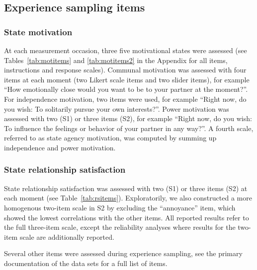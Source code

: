 \documentclass[jou,a4paper,draftfirst]{apa6}\usepackage[]{graphicx}\usepackage[]{color}
\begin{document}
\subsection{Experience sampling items}

\subsubsection{State motivation}
At each measurement occasion, three five motivational states were assessed (see Tables~\ref{tab:motitems} and \ref{tab:motitems2} in the Appendix for all items, instructions and response scales). Communal motivation was assessed with four items at each moment (two Likert scale items and two slider items), for example ``How emotionally close would you want to be to your partner at the moment?''. For independence motivation, two items were used, for example ``Right now, do you wish: To solitarily pursue your own interests?''. Power motivation was assessed with two (S1) or three items (S2), for example ``Right now, do you wish: To influence the feelings or behavior of your partner in any way?''. A fourth scale, referred to as state agency motivation, was computed by summing up independence and power motivation.

\subsubsection{State relationship satisfaction}
State relationship satisfaction was assessed with two (S1) or three items (S2) at each moment (see Table~\ref{tab:rsitems}). Exploratorily, we also constructed a more homogenous two-item scale in S2 by excluding the ``annoyance'' item, which showed the lowest correlations with the other items. All reported results refer to the full three-item scale, except the reliability analyses where results for the two-item scale are additionally reported.

Several other items were assessed during experience sampling, see the primary documentation of the data sets for a full list of items.
\end{document}
